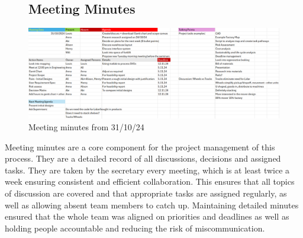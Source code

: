 \documentclass[12pt]{article}
\begin{document}
\FloatBarrier
\begin{figure}[h!]
 \subsection{Meeting Minutes}
    \includegraphics[width=1\textwidth]{HalloweenMinutes1.png}
    \caption{Meeting minutes from 31/10/24}
    \label{fig:x}
\end{figure}
  \FloatBarrier
Meeting minutes are a core component for the project management of this process. They are a detailed record of all discussions, decisions and assigned tasks. They are taken by the secretary every meeting, which is at least twice a week ensuring consistent and efficient collaboration. This ensures that all topics of discussion are covered and that appropriate tasks are assigned regularly, as well as allowing absent team members to catch up. Maintaining detailed minutes ensured that the whole team was aligned on priorities and deadlines as well as holding people accountable and reducing the risk of miscommunication.
\end{document}
